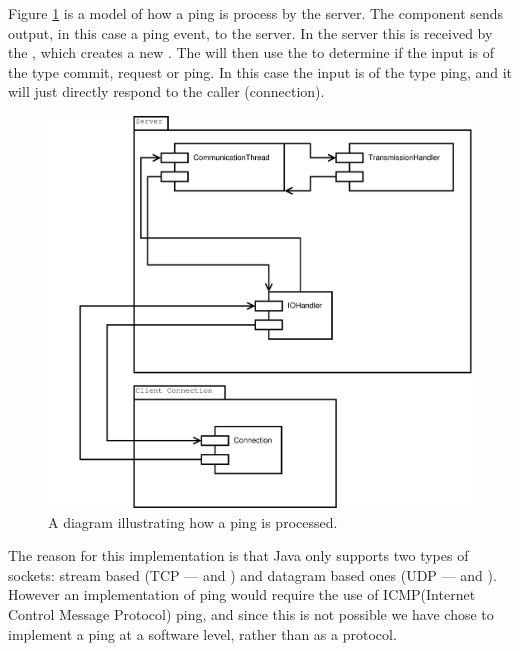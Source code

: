 Figure \ref{fig:IOPing} is a model of how a ping is process by the server. The  component sends output, in this case a ping event, to the server. In the server this is received by the , which creates a new \newline {}.
The  will then use the \newline {} to determine if the input is of the type commit, request or ping.
In this case the input is of the type ping, and it will just directly respond to the caller (connection).
\begin{figure}[htbp]
	\centering
          \includegraphics[scale=0.30]{images/ping}%
	\caption{A diagram illustrating how a ping is processed.} 
	\label{fig:IOPing}
\end{figure}

The reason for this implementation is that Java only supports two types of sockets: stream based (TCP ---  and ) and datagram based ones (UDP ---  \newline and )\cite{ICMP}\cite{javaNET}. However an implementation of ping would require the use of ICMP(Internet Control Message Protocol) ping, and since this is not possible we have chose to implement a ping at a software level, rather than as a protocol.


